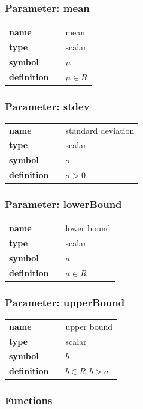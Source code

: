 \documentclass{article}
\begin{document}
\subsubsection*{Parameter: mean}

\noindent\begin{tabular}{p{2cm}cl}
\textbf{name} & & mean \\
\textbf{type} & & scalar \\
\textbf{symbol} & & $\mu$  \\
\textbf{definition} & & $\mu \in R$
\end{tabular}
\subsubsection*{Parameter: stdev}

\noindent\begin{tabular}{p{2cm}cl}
\textbf{name} & & standard deviation \\
\textbf{type} & & scalar \\
\textbf{symbol} & & $\sigma$  \\
\textbf{definition} & & $\sigma > 0$
\end{tabular}
\subsubsection*{Parameter: lowerBound}

\noindent\begin{tabular}{p{2cm}cl}
\textbf{name} & & lower bound \\
\textbf{type} & & scalar \\
\textbf{symbol} & & $a$  \\
\textbf{definition} & & $a \in R$
\end{tabular}
\subsubsection*{Parameter: upperBound}

\noindent\begin{tabular}{p{2cm}cl}
\textbf{name} & & upper bound \\
\textbf{type} & & scalar \\
\textbf{symbol} & & $b$  \\
\textbf{definition} & & $b \in R, b > a$
\end{tabular}
\subsubsection*{Functions}
\end{document}
